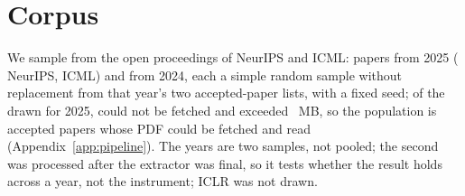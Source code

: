 \documentclass{article}
\begin{document}
\section{Corpus}
\label{sec:corpus}

We sample from the open proceedings of NeurIPS and ICML: \nPapersTwentyFive{}
papers from 2025 (\nNeuripsPapers{} NeurIPS, \nIcmlPapers{} ICML) and
\nPapersTwentyFour{} from 2024, each a simple random sample without replacement
from that year's two accepted-paper lists, with a fixed seed; of the
\nDrawnTwentyFive{} drawn for 2025, \nDownloadFailed{} could not be fetched
and \nSkippedLarge{} exceeded \nMaxPdfMb{}~MB, so the population is accepted
papers whose PDF could be fetched and read (Appendix~\ref{app:pipeline}). The
years are two samples, not pooled; the second was processed after the
extractor was final, so it tests whether the result holds across a year, not
the instrument; ICLR was not drawn.
\end{document}
